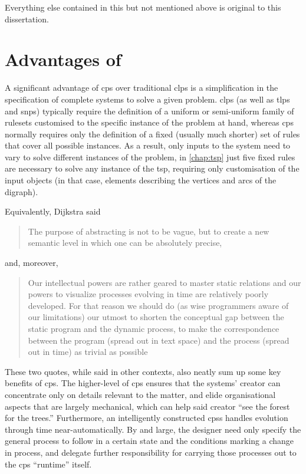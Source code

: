 Everything else contained in this  but not mentioned above is original to this dissertation.


\section{Advantages of }
A significant advantage of \gls{cps} over traditional \gls{clps} is a simplification in the specification of complete systems to solve a given problem.  \Gls{clps} (as well as \gls{tlps} and \gls{snps}) typically require the definition of a uniform or semi-uniform family of \glspl{ruleset} customised to the specific instance of the problem at hand, whereas \gls{cps} normally requires only the definition of a fixed (usually much shorter) set of rules that cover all possible instances. As a result, only inputs to the system need to vary to solve different instances of the problem, \eg{} in \cref{chap:tsp} just five fixed rules are necessary to solve any instance of the \gls{tsp}, requiring only customisation of the input objects (in that case, elements describing the vertices and arcs of the digraph).

Equivalently, Dijkstra \cite{DijkstraWikiquote} said \blockquote{The purpose of abstracting is not to be vague, but to create a new semantic level in which one can be absolutely precise,} and, moreover, \blockquote{Our intellectual powers are rather geared to master static relations and \textelp{} our powers to visualize processes evolving in time are relatively poorly developed. For that reason we should do (as wise programmers aware of our limitations) our utmost to shorten the conceptual gap between the static program and the dynamic process, to make the correspondence between the program (spread out in text space) and the process (spread out in time) as trivial as possible}.  These two quotes, while said in other contexts, also neatly sum up some key benefits of \gls{cps}.  The higher-level of \gls{cps} ensures that the systems' creator can concentrate only on details relevant to the matter, and elide organisational aspects that are largely mechanical, which can help said creator \enquote{see the forest for the trees.}  Furthermore, an intelligently constructed \glspl{cps} handles evolution through time near-automatically.  By and large, the designer need only specify the general process to follow in a certain state and the conditions marking a change in process, and delegate further responsibility for carrying those processes out to the \gls{cps} ``runtime'' itself.

